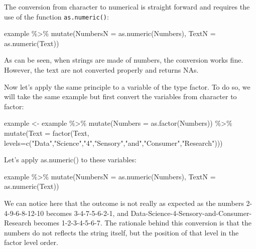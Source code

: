 \documentclass[
]{book}
\newenvironment{Shaded}{\begin{snugshade}}{\end{snugshade}}
\newcommand{\AttributeTok}[1]{\textcolor[rgb]{0.77,0.63,0.00}{#1}}
\newcommand{\FunctionTok}[1]{\textcolor[rgb]{0.00,0.00,0.00}{#1}}
\newcommand{\NormalTok}[1]{#1}
\newcommand{\OtherTok}[1]{\textcolor[rgb]{0.56,0.35,0.01}{#1}}
\newcommand{\SpecialCharTok}[1]{\textcolor[rgb]{0.00,0.00,0.00}{#1}}
\newcommand{\StringTok}[1]{\textcolor[rgb]{0.31,0.60,0.02}{#1}}
\begin{document}
The conversion from character to numerical is straight forward and requires the use of the function \texttt{as.numeric()}:

\begin{Shaded}
\begin{Highlighting}[]
\NormalTok{example }\SpecialCharTok{\%\textgreater{}\%} 
  \FunctionTok{mutate}\NormalTok{(}\AttributeTok{NumbersN =} \FunctionTok{as.numeric}\NormalTok{(Numbers), }\AttributeTok{TextN =} \FunctionTok{as.numeric}\NormalTok{(Text))}
\end{Highlighting}
\end{Shaded}

As can be seen, when strings are made of numbers, the conversion works fine. However, the text are not converted properly and returns NAs.

Now let's apply the same principle to a variable of the type factor. To do so, we will take the same example but first convert the variables from character to factor:

\begin{Shaded}
\begin{Highlighting}[]
\NormalTok{example }\OtherTok{\textless{}{-}}\NormalTok{ example }\SpecialCharTok{\%\textgreater{}\%} 
  \FunctionTok{mutate}\NormalTok{(}\AttributeTok{Numbers =} \FunctionTok{as.factor}\NormalTok{(Numbers)) }\SpecialCharTok{\%\textgreater{}\%} 
  \FunctionTok{mutate}\NormalTok{(}\AttributeTok{Text =} \FunctionTok{factor}\NormalTok{(Text, }\AttributeTok{levels=}\FunctionTok{c}\NormalTok{(}\StringTok{"Data"}\NormalTok{,}\StringTok{"Science"}\NormalTok{,}\StringTok{"4"}\NormalTok{,}\StringTok{"Sensory"}\NormalTok{,}\StringTok{"and"}\NormalTok{,}\StringTok{"Consumer"}\NormalTok{,}\StringTok{"Research"}\NormalTok{)))}
\end{Highlighting}
\end{Shaded}

Let's apply as.numeric() to these variables:

\begin{Shaded}
\begin{Highlighting}[]
\NormalTok{example }\SpecialCharTok{\%\textgreater{}\%} 
  \FunctionTok{mutate}\NormalTok{(}\AttributeTok{NumbersN =} \FunctionTok{as.numeric}\NormalTok{(Numbers), }\AttributeTok{TextN =} \FunctionTok{as.numeric}\NormalTok{(Text))}
\end{Highlighting}
\end{Shaded}

We can notice here that the outcome is not really as expected as the numbers 2-4-9-6-8-12-10 becomes 3-4-7-5-6-2-1, and Data-Science-4-Sensory-and-Consumer-Research becomes 1-2-3-4-5-6-7. The rationale behind this conversion is that the numbers do not reflects the string itself, but the position of that level in the factor level order.
\end{document}
